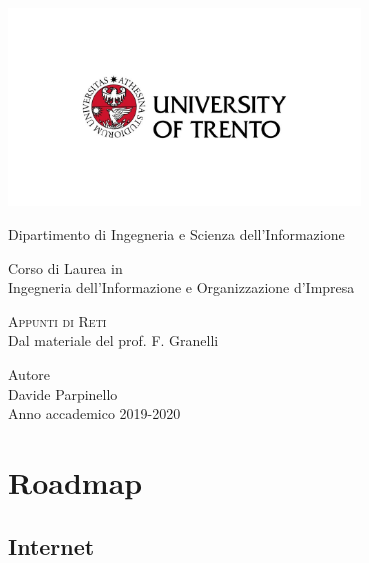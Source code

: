 \documentclass{report}
\begin{document}
	
	\begin{titlepage}
	\centering
	\includegraphics[width=0.7\textwidth, keepaspectratio]{logounitn.jpg}

	\vspace{1.6cm}
	\LARGE{Dipartimento di Ingegneria e Scienza dell'Informazione\\}

	\vspace{1cm}
	\Large{Corso di Laurea in\\ Ingegneria dell'Informazione e Organizzazione d'Impresa}

	\vspace{1cm}
	\Huge\textsc{Appunti di Reti\\}
	\large{Dal materiale del prof. F. Granelli}

	\vspace{2cm}
	\Large{Autore}\\
	\large{Davide Parpinello}
	\\
	\vspace{2cm}
	\LARGE{Anno accademico 2019-2020}
	\end{titlepage}
	
	\tableofcontents
	\renewcommand{\chaptermark}[1]{%
		\markboth{#1}{}}
	\pagestyle{fancy}
	\fancyhf{}
	\lhead{\leftmark}
	\rfoot{\thepage}
	
	\chapter{Roadmap}
	\section{Internet}
	
\end{document}
